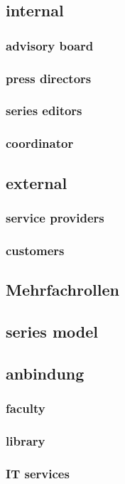 \documentclass[output=guidelines,guidelines] {langscibook}
\begin{document}
\subsection{internal}
\subsubsection{advisory board}
\subsubsection{press directors}
\subsubsection{series editors}
\subsubsection{coordinator}
\subsection{external}
\subsubsection{service providers}
\subsubsection{customers}
\subsection{Mehrfachrollen}
\subsection{series model}
\subsection{anbindung}
\subsubsection{faculty}
\subsubsection{library}
\subsubsection{IT services}
\end{document}
